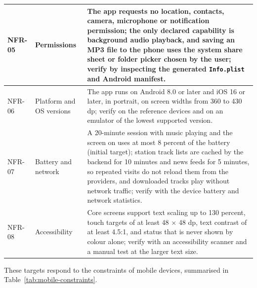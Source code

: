\begin{longtable}{|>{\raggedright\arraybackslash}p{2cm}|>{\raggedright\arraybackslash}p{3.2cm}|>{\raggedright\arraybackslash}p{}|}
NFR-05 & Permissions & The app requests no location, contacts, camera,
microphone or notification permission; the only declared capability is
background audio playback, and saving an MP3 file to the phone uses the
system share sheet or folder picker chosen by the user; verify by inspecting
the generated \texttt{Info.plist} and Android manifest. \\
\hline

NFR-06 & Platform and OS versions & The app runs on Android 8.0 or later and iOS
16 or later, in portrait,
on screen widths from 360 to 430 dp; verify on the reference devices and on an
emulator of the lowest supported version. \\
\hline

NFR-07 & Battery and network & A 20-minute session with music playing and the
screen on uses at most 8 percent of the battery (initial target); station
track lists are cached by the backend for 10 minutes and news feeds for 5
minutes, so repeated visits do not reload them from the providers, and
downloaded tracks play without network traffic; verify with the device battery
and network statistics. \\
\hline

NFR-08 & Accessibility & Core screens support text scaling up to 130 percent,
touch targets of at least 48 $\times$ 48 dp, text contrast of at least 4.5:1,
and status that is never shown by colour alone; verify with an accessibility
scanner and a manual test at the larger text size. \\
\hline
\end{longtable}
\endgroup

These targets respond to the constraints of mobile devices, summarised in
Table~\ref{tab:mobile-constraints}.

